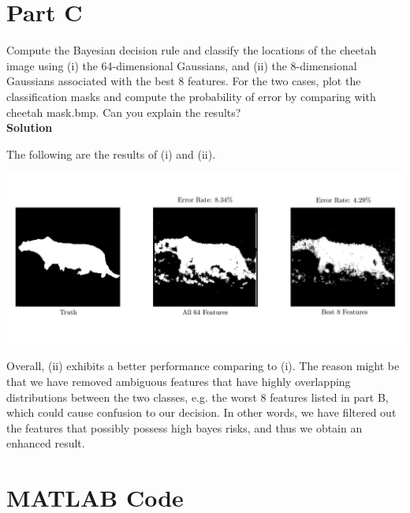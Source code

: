 \documentclass{article}
\begin{document}
\pagebreak

\section*{Part C}

Compute the Bayesian decision rule and classify the locations of the cheetah image using (i) the
64-dimensional Gaussians, and (ii) the 8-dimensional Gaussians associated with the best 8 features. For
the two cases, plot the classification masks and compute the probability of error by comparing with
cheetah mask.bmp. Can you explain the results?
\\

\textbf{\large Solution}

The following are the results of (i) and (ii).
\begin{center}
  \includegraphics[width=\textwidth]{result}
\end{center}

Overall, (ii) exhibits a better performance comparing to (i). 
The reason might be that we have removed ambiguous features that have highly overlapping distributions between the two classes, e.g. the worst 8 features listed in part B, which could cause confusion to our decision.
In other words, we have filtered out the features that possibly possess high bayes risks, and thus we obtain an enhanced result.

\pagebreak

\section*{MATLAB Code}
\end{document}
